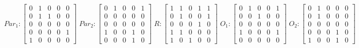      $$
        Par_{1} : \begin{bmatrix}
            0 & 1 & 0 & 0 & 0 \\
            0 & 1 & 1 & 0 & 0 \\
            0 & 0 & 0 & 0 & 0 \\
			0 & 0 & 0 & 0 & 1 \\
            1 & 0 & 0 & 0 & 0 
        \end{bmatrix}
        \;
        Par_{2} : \begin{bmatrix}
            0 & 1 & 0 & 0 & 1 \\
            0 & 0 & 0 & 0 & 0 \\
            0 & 0 & 0 & 0 & 0 \\
            1 & 0 & 0 & 1 & 0 \\
            0 & 0 & 0 & 1 & 0
        \end{bmatrix}
        \;
        R : \begin{bmatrix}
            1 & 1 & 0 & 1 & 1 \\
            0 & 1 & 0 & 0 & 1 \\
            0 & 0 & 0 & 1 & 0 \\
            1 & 1 & 0 & 0 & 0 \\
            1 & 0 & 1 & 0 & 0
        \end{bmatrix}
        \;
        O_{1} : \begin{bmatrix}
            0 & 1 & 0 & 0 & 1 \\
            0 & 0 & 1 & 0 & 0 \\
            0 & 0 & 0 & 0 & 0 \\
            1 & 0 & 0 & 0 & 1 \\
            0 & 0 & 0 & 0 & 0
        \end{bmatrix}
        \;
        O_{2} : \begin{bmatrix}
            0 & 1 & 0 & 0 & 0 \\
            0 & 1 & 0 & 0 & 0 \\
            0 & 0 & 0 & 0 & 0 \\
            0 & 0 & 0 & 1 & 0 \\
            1 & 0 & 0 & 1 & 0
        \end{bmatrix}
    $$ 
